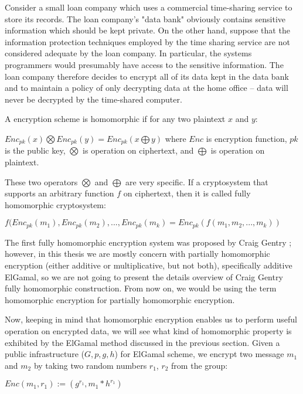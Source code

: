        \begin{displayquote}  
	     Consider a small loan company which uses a commercial time-sharing service to store its records.  
	     The loan company’s "data bank" obviously contains sensitive information which should be kept private.  
	     On the other hand, suppose that the information protection techniques employed by the time sharing 
	     service are not considered adequate by the loan company.  In particular, the systems programmers would 
	     presumably have access to the sensitive information.  The loan company therefore decides to encrypt all 
	     of its data kept in the data bank and to maintain a policy of only decrypting data at the home office -- data 
	     will never be decrypted by the time-shared computer.
	   \end{displayquote}  

 \noindent	     
 A encryption scheme is homomorphic if for any two plaintext $x$ and $y$:
		\begin{displayquote}
		
		 $Enc_{pk}(x) \bigotimes Enc_{pk}(y) = Enc_{pk} (x \bigoplus y)$  where 
		$Enc$ is encryption function, $pk$ is the public key, $\bigotimes$ is operation on ciphertext, and $\bigoplus$
		 is operation on plaintext.
		
		\end{displayquote}
				
		These two operators $\bigotimes$ and $\bigoplus$ are very specific. If a cryptosystem that supports an arbitrary 
		function $f$ on ciphertext, then it is called fully homomorphic cryptosystem:
		\begin{displayquote}
		  $ f (Enc_{pk}(m_{1}), Enc_{pk}(m_{2}), ..., Enc_{pk}(m_{k}) = Enc_{pk}( f (m_{1}, m_{2}, ..., m_{k}))$ 
	    \end{displayquote}
		
		\noindent
		The first fully homomorphic encryption system was proposed by Craig Gentry \citep{Gentry:2009:FHE:1834954}; however, 
		in this thesis we are mostly concern with partially homomorphic encryption (either additive or multiplicative, but not both),
		specifically additive ElGamal, 
		so we are not going to present the details overview 
		of Craig Gentry fully homomorphic construction. From now on, we would be using the term homomorphic encryption for 
		partially homomorphic encryption. 
		 	    
	    
	    
	    
	     
	    Now, keeping in mind that homomorphic encryption enables us to perform useful operation on encrypted data, 
	    we will see what kind of homomorphic property is exhibited by the ElGamal method discussed in the previous section. 
	    Given a public infrastructure ($G, p, g, h$) for ElGamal scheme, 
	     we encrypt two message $m_{1}$ and $m_{2}$ by taking two random numbers $r_{1}$,  $r_{2}$ from the group:
	     \begin{displayquote}
	     $Enc(m_{1}, r_{1}) := (g^{r_{1}}, m_{1} *  h^{r_{1}})$ 
	      \end{displayquote}
	     
